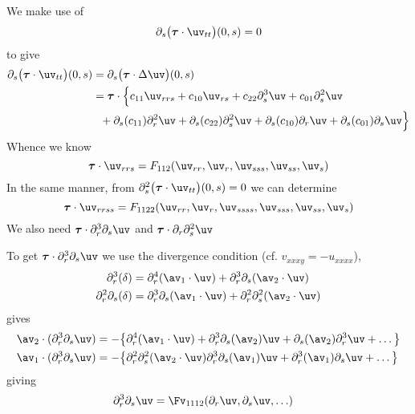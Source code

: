 \documentclass[10pt]{article}
\begin{document}
We make use of 
\[
 \partial_s\big(\tauv\cdot\uv_{tt}\big)(0,s) = 0  
\]
to give
\begin{align*}
  \partial_s\big(\tauv\cdot\uv_{tt}\big)(0,s) &= \partial_s\big(\tauv\cdot\Delta\uv\big)(0,s) \\
     &= \tauv\cdot\Big\{ c_{11} \uv_{rrs} +  c_{10} \uv_{rs}  + c_{22}\partial_s^3\uv  + c_{01} \partial_s^2\uv  \\
     &~~+  \partial_s(c_{11})\partial_r^2\uv + \partial_s(c_{22})\partial_s^2\uv  + 
         \partial_s(c_{10})\partial_r\uv + \partial_s(c_{01}) \partial_s \uv \Big\}
\end{align*}
Whence we know
\begin{equation}
  \tauv\cdot\uv_{rrs} = F_{112}( \uv_{rr}, \uv_{r}, \uv_{sss}, \uv_{ss}, \uv_s) \label{eq:rrs}
\end{equation}
In the same manner, from $\partial_s^2\big(\tauv\cdot\uv_{tt}\big)(0,s) = 0 $
we can determine
 \begin{equation}
  \tauv\cdot\uv_{rrss} = F_{1122}( \uv_{rr}, \uv_{r}, \uv_{ssss}, \uv_{sss}, \uv_{ss}, \uv_s)  \label{eq:rrss}
\end{equation}
We also need $\tauv\cdot\partial_r^3\partial_s\uv$ and $\tauv\cdot\partial_r\partial_s^2\uv$

To get $\tauv\cdot\partial_r^3\partial_s\uv$ we use the divergence condition (cf. $v_{xxxy}=-u_{xxxx}$),
\begin{align*}
  \partial_r^3(\delta) &= \partial_r^4(\av_1\cdot\uv) +\partial_r^3\partial_s(\av_2\cdot\uv) \\
   \partial_r^2\partial_s(\delta) &= \partial_r^3\partial_s(\av_1\cdot\uv) +\partial_r^2\partial_s^2(\av_2\cdot\uv)
\end{align*}
gives
\begin{align*}
\av_2\cdot(\partial_r^3\partial_s\uv) &= -\big\{ \partial_r^4(\av_1\cdot\uv) +\partial_r^3\partial_s(\av_2)\uv
                         +\partial_s(\av_2)\partial_r^3\uv + \ldots \big\} \\
\av_1\cdot(\partial_r^3\partial_s\uv) &= -\big\{ \partial_r^2\partial_s^2(\av_2\cdot\uv)
               \partial_r^3\partial_s(\av_1)\uv + \partial_r^3 (\av_1)\partial_s\uv + \ldots    \big\}
\end{align*}
giving
\begin{align*}
\partial_r^3\partial_s\uv &= \Fv_{1112}(\partial_r\uv,\partial_s\uv, \ldots)
\end{align*}
\end{document}
